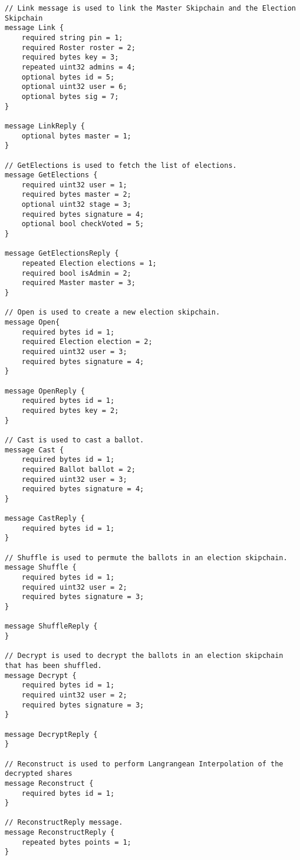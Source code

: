 \begin{lstlisting}[caption={Protobuf API Specification}, captionpos=b, language=protobuf2, style=protobuf]
// Link message is used to link the Master Skipchain and the Election Skipchain
message Link {
    required string pin = 1;
    required Roster roster = 2;
    required bytes key = 3;
    repeated uint32 admins = 4;
    optional bytes id = 5;
    optional uint32 user = 6;
    optional bytes sig = 7;
}

message LinkReply {
    optional bytes master = 1;
}

// GetElections is used to fetch the list of elections.
message GetElections {
    required uint32 user = 1;
    required bytes master = 2;
    optional uint32 stage = 3;
    required bytes signature = 4;
    optional bool checkVoted = 5;
}

message GetElectionsReply {
    repeated Election elections = 1;
    required bool isAdmin = 2;
    required Master master = 3;
}

// Open is used to create a new election skipchain.
message Open{
    required bytes id = 1;
    required Election election = 2;
    required uint32 user = 3;
    required bytes signature = 4;
}

message OpenReply {
    required bytes id = 1;
    required bytes key = 2;
}

// Cast is used to cast a ballot.
message Cast {
    required bytes id = 1;
    required Ballot ballot = 2;
    required uint32 user = 3;
    required bytes signature = 4;
}

message CastReply {
    required bytes id = 1;
}

// Shuffle is used to permute the ballots in an election skipchain.
message Shuffle {
    required bytes id = 1;
    required uint32 user = 2;
    required bytes signature = 3;
}

message ShuffleReply {
}

// Decrypt is used to decrypt the ballots in an election skipchain that has been shuffled.
message Decrypt {
    required bytes id = 1;
    required uint32 user = 2;
    required bytes signature = 3;
}

message DecryptReply {
}

// Reconstruct is used to perform Langrangean Interpolation of the decrypted shares
message Reconstruct {
	required bytes id = 1;
}

// ReconstructReply message.
message ReconstructReply {
	repeated bytes points = 1;
}
\end{lstlisting}
